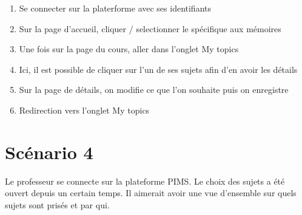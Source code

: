 \documentclass[a4paper, 11pt]{article}
\begin{document}
\begin{tcolorbox}
    \begin{enumerate}
        \item Se connecter sur la platerforme avec ses identifiants
        \item Sur la page d'accueil, cliquer / selectionner le spécifique aux mémoires
        \item Une fois sur la page du cours, aller dans l'onglet \og My topics\fg{}
        \item Ici, il est possible de cliquer sur l'un de ses sujets afin d'en avoir les détails
        \item Sur la page de détails, on modifie ce que l'on souhaite puis on enregistre
        \item Redirection vers l'onglet \og My topics\fg{}
    \end{enumerate}
\end{tcolorbox}



\section*{Scénario 4}
Le professeur se connecte sur la plateforme PIMS. Le choix des sujets a été ouvert depuis un certain temps. Il aimerait avoir une vue d'ensemble sur quels sujets sont prisés et par qui.
\end{document}
